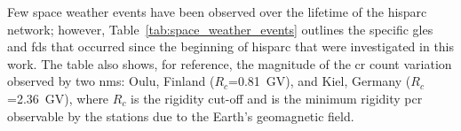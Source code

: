 Few space weather events have been observed over the lifetime of the \gls{hisparc} network; however, Table~\ref{tab:space_weather_events} outlines the specific \glspl{gle} and \glspl{fd} that occurred since the beginning of \gls{hisparc} that were investigated in this work. The table also shows, for reference, the magnitude of the \gls{cr} count variation observed by two \glspl{nm}: Oulu, Finland ($R_c$=0.81~GV), and Kiel, Germany ($R_c$=2.36~GV), where $R_c$ is the rigidity cut-off and is the minimum rigidity \gls{pcr} observable by the stations due to the Earth's geomagnetic field.


